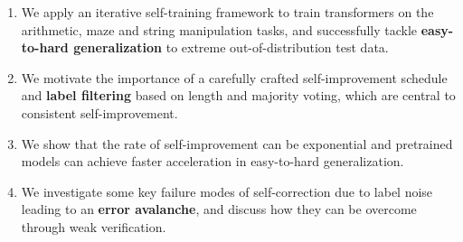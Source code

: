 \begin{enumerate}[left=5pt] %
    \setlength{\parskip}{0pt}
    \setlength{\itemsep}{0pt plus 1pt}
    \item We apply an iterative self-training framework to train transformers on the arithmetic, maze and string manipulation tasks, and successfully tackle \textbf{easy-to-hard generalization} to extreme out-of-distribution test data. 
    \item We motivate the importance of a carefully crafted self-improvement schedule and \textbf{label filtering} based on length and majority voting, which are central to consistent self-improvement.
    \item We show that the rate of self-improvement can be exponential and pretrained models can achieve faster acceleration in easy-to-hard generalization.
    \item We investigate some key failure modes of self-correction due to label noise leading to an \textbf{error avalanche}, and discuss how they can be overcome through weak verification.
\end{enumerate}






